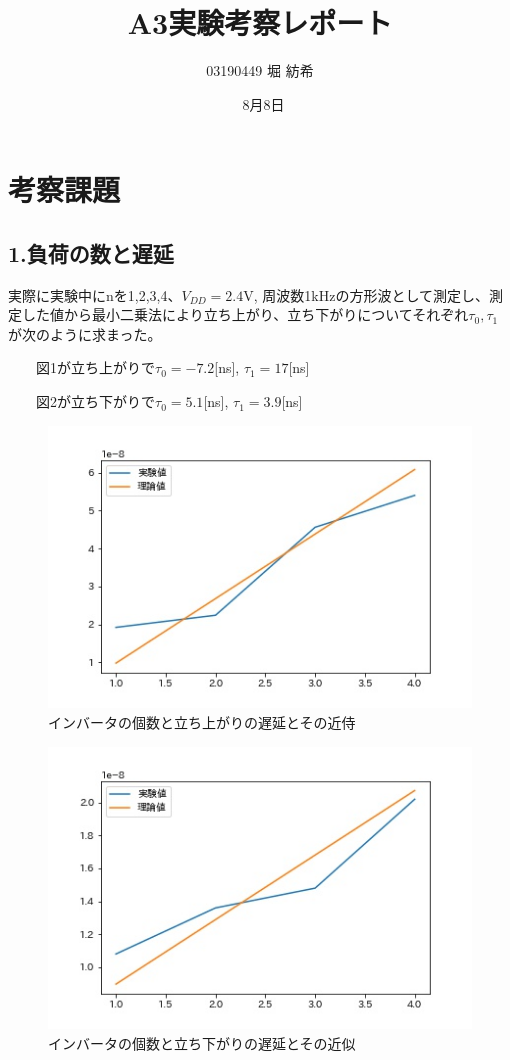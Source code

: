 \documentclass[dvipdfmx]{jsarticle}
\begin{document}
\title{A3実験考察レポート}
\author{03190449  堀 紡希}
\date{\ 8月8日}
\maketitle

\section{考察課題}



\subsection{1.負荷の数と遅延}
実際に実験中にnを1,2,3,4、$V_{DD} = 2.4$V, 周波数1kHzの方形波として測定し、測定した値から最小二乗法により立ち上がり、立ち下がりについてそれぞれ$\tau_{0}, \tau_{1}$が次のように求まった。

　　図1が立ち上がりで$\tau_{0} = -7.2$[ns], $\tau_{1} = 17$[ns]


　　図2が立ち下がりで$\tau_{0} = 5.1$[ns], $\tau_{1} = 3.9$[ns]

\begin{figure}[H]
\begin{center}
\includegraphics[scale = 0.4]{up.jpg}
\caption{インバータの個数と立ち上がりの遅延とその近侍}
\end{center}
\end{figure}

\begin{figure}[H]
\begin{center}
\includegraphics[scale = 0.4]{down.jpg}
\caption{インバータの個数と立ち下がりの遅延とその近似}
\end{center}
\end{figure}
\end{document}
